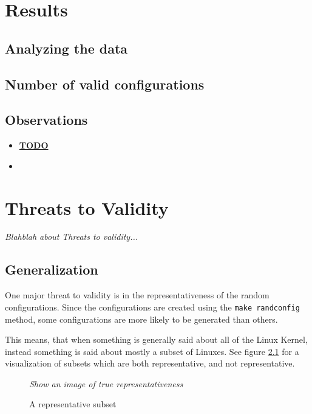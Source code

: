 \documentclass[a4paper,11pt]{report}
\newcommand{\textcode}[1]{
    \fboxsep=1pt
    \texttt{\colorbox{gray!20}{#1}}
}
\newcommand{\figa}{
    \begin{figure}[!htpb]
    \centering
}
\newcommand{\figb}[2]{
    \caption{#1}
    \label{#2}
    \end{figure}
}
\begin{document}
\chapter{Results}

\section{Analyzing the data}

\section{Number of valid configurations}

\section{Observations}


\begin{itemize}
    \item \underline{\textbf{TODO}}
        \item 
\end{itemize}


\newpage
\chapter{Threats to Validity}
\label{sec:ttv}

\emph{Blahblah about Threats to validity...}

\section{Generalization}

One major threat to validity is in the representativeness of the random 
configurations. Since the configurations are created using the \textcode{make 
randconfig} method, some configurations are more likely to be generated than 
others.

This means, that when something is generally said about all of the Linux 
Kernel, instead something is said about mostly a subset of Linuxes. See figure 
\ref{fig:repsubset} for a visualization of subsets which are both 
representative, and not representative.

\figa
    \emph{Show an image of true representativeness}
\figb{A representative subset}{fig:repsubset}
\end{document}
